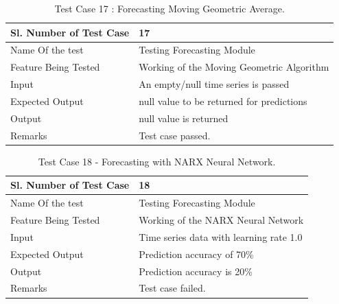 \documentclass[12pt,a4paper]{report}
\begin{document}
\begin{table}
    \begin{tabular}{|l|l|}
    \hline
    Sl. Number of Test Case & 17                            \\ \hline
    Name Of the test        & Testing Forecasting Module     \\ \hline
    Feature Being Tested    & Working of the Moving Geometric Algorithm \\ \hline
    Input                   & An empty/null time series is passed\\ \hline
    Expected Output         & null value to be returned for predictions \\ \hline
    Output                  & null value is returned \\ \hline
    Remarks                 & Test case passed.             \\ \hline
    \end{tabular}
    \caption {Test Case 17 : Forecasting Moving Geometric Average.}
\end{table}

\begin{table}
    \begin{tabular}{|l|l|}
    \hline
    Sl. Number of Test Case & 18                            \\ \hline
    Name Of the test        & Testing Forecasting Module     \\ \hline
    Feature Being Tested    & Working of the NARX Neural Network \\ \hline
    Input                   & Time series data with learning rate 1.0\\ \hline
    Expected Output         & Prediction accuracy of 70\% \\ \hline
    Output                  & Prediction accuracy is 20\% \\ \hline
    Remarks                 & Test case failed.             \\ \hline
    \end{tabular}
    \caption {Test Case 18 - Forecasting with NARX Neural Network.}
\end{table}

\pagestyle{fancy}
\chead{}
\rfoot{\small{\thepage}}
\renewcommand{\headrulewidth}{0.4pt}
\renewcommand{\footrulewidth}{0.4pt}
\end{document}
